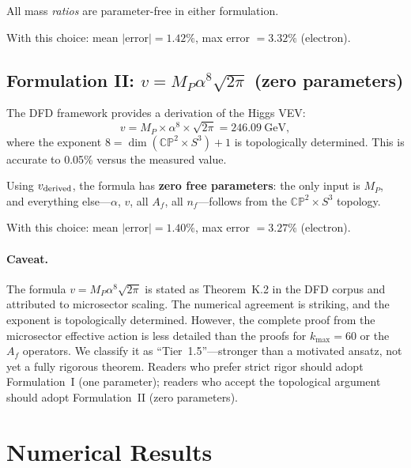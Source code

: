 \documentclass[11pt,a4paper]{article}
\newcommand{\CP}{\mathbb{CP}}
\theoremstyle{definition}
\theoremstyle{remark}
\begin{document}
All mass \emph{ratios} are parameter-free in either formulation.

With this choice: mean $|$error$| = 1.42\%$, max error $= 3.32\%$ (electron).

\subsection{Formulation II: $v = M_P\alpha^8\sqrt{2\pi}$ (zero parameters)}

The DFD framework provides a derivation of the Higgs VEV:
\begin{equation}\label{eq:v_derived}
  v = M_P \times \alpha^8 \times \sqrt{2\pi} = 246.09~\text{GeV},
\end{equation}
where the exponent $8 = \dim(\CP^2\times S^3) + 1$ is topologically
determined.
This is accurate to 0.05\% versus the measured value.

Using $v_{\rm derived}$, the formula has \textbf{zero free parameters}:
the only input is $M_P$, and everything else---$\alpha$, $v$, all
$A_f$, all $n_f$---follows from the $\CP^2\times S^3$ topology.

With this choice: mean $|$error$| = 1.40\%$, max error $= 3.27\%$ (electron).

\paragraph{Caveat.}
The formula $v = M_P\alpha^8\sqrt{2\pi}$ is stated as Theorem~K.2
in the DFD corpus and attributed to microsector scaling.
The numerical agreement is striking, and the exponent is
topologically determined.
However, the complete proof from the microsector effective action
is less detailed than the proofs for $k_{\max} = 60$ or the
$A_f$ operators.
We classify it as ``Tier~1.5''---stronger than a motivated ansatz,
not yet a fully rigorous theorem.
Readers who prefer strict rigor should adopt Formulation~I (one
parameter); readers who accept the topological argument should
adopt Formulation~II (zero parameters).

\section{Numerical Results}
\label{sec:results}
\end{document}
